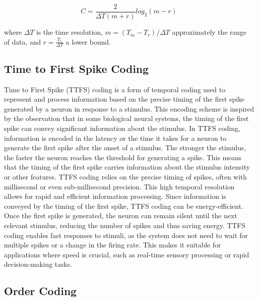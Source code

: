 \documentclass{article}
\begin{document}
$$C=\frac{2}{\Delta T(m+ r)} log_2(m- r)$$

where $\Delta T$ is the time resolution, $m=(T_m-T_r)/\Delta T$ approximately the range of data, and $r=\frac{T_r}{\Delta T}$ a lower bound. 

\subsection{Time to First Spike Coding}

Time to First Spike (TTFS) coding \cite{bonilla2022analyzing} is a form of temporal coding used to represent and process information based on the precise timing of the first spike generated by a neuron in response to a stimulus. This encoding scheme is inspired by the observation that in some biological neural systems, the timing of the first spike can convey significant information about the stimulus. In TTFS coding, information is encoded in the latency or the time it takes for a neuron to generate the first spike after the onset of a stimulus. The stronger the stimulus, the faster the neuron reaches the threshold for generating a spike. This means that the timing of the first spike carries information about the stimulus intensity or other features. TTFS coding relies on the precise timing of spikes, often with millisecond or even sub-millisecond precision. This high temporal resolution allows for rapid and efficient information processing. Since information is conveyed by the timing of the first spike, TTFS coding can be energy-efficient. Once the first spike is generated, the neuron can remain silent until the next relevant stimulus, reducing the number of spikes and thus saving energy. TTFS coding enables fast responses to stimuli, as the system does not need to wait for multiple spikes or a change in the firing rate. This makes it suitable for applications where speed is crucial, such as real-time sensory processing or rapid decision-making tasks.

\subsection{Order Coding}
\end{document}
